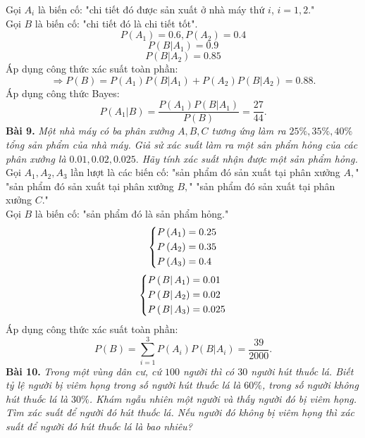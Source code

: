 \documentclass[12pt,a4paper]{article}
\begin{document}
Gọi $A_i$ là biến cố: "chi tiết đó được sản xuất ở nhà máy thứ $i$, $i = 1, 2$."\\
Gọi $B$ là biến cố: "chi tiết đó là chi tiết tốt".\\
$$P\left( {{A_1}} \right) = 0.6,P\left( {{A_2}} \right) = 0.4$$
$$P\left( {\left. B \right|{A_1}} \right) = 0.9$$
$$P\left( {\left. B \right|{A_2}} \right) = 0.85$$
Áp dụng công thức xác suất toàn phần:
$$ \Rightarrow P\left( B \right) = P\left( {{A_1}} \right)P\left( {\left. B \right|{A_1}} \right) + P\left( {{A_2}} \right)P\left( {\left. B \right|{A_2}} \right) = 0.88.$$
Áp dụng công thức Bayes:
$$P\left( {\left. {{A_1}} \right|B} \right) = \frac{{P\left( {{A_1}} \right)P\left( {\left. B \right|{A_1}} \right)}}{{P\left( B \right)}} = \frac{{27}}{{44}}.$$
\textbf{Bài 9.} \textit{Một nhà máy có ba phân xưởng $A, B, C$ tương ứng làm ra $25\%, 35\%, 40\%$ tổng sản phẩm của nhà máy. Giả sử xác suất làm ra một sản phẩm hỏng của các phân xưởng là $0.01, 0.02, 0.025.$ Hãy tính xác suất nhận được một sản phẩm hỏng.}\\
Gọi $A_1, A_2, A_3$ lần lượt là các biến cố: "sản phẩm đó sản xuất tại phân xưởng $A,$" "sản phẩm đó sản xuất tại phân xưởng $B,$" "sản phẩm đó sản xuất tại phân xưởng $C.$"\\
Gọi $B$ là biến cố: "sản phẩm đó là sản phẩm hỏng."\\
$$\left\{ \begin{gathered}
  P\left( {{A_1}} \right) = 0.25 \hfill \\
  P\left( {{A_2}} \right) = 0.35 \hfill \\
  P\left( {{A_3}} \right) = 0.4 \hfill \\ 
\end{gathered}  \right.$$
$$\left\{ \begin{gathered}
  P\left( {\left. B \right|{A_1}} \right) = 0.01 \hfill \\
  P\left( {\left. B \right|{A_2}} \right) = 0.02 \hfill \\
  P\left( {\left. B \right|{A_3}} \right) = 0.025 \hfill \\ 
\end{gathered}  \right.$$
Áp dụng công thức xác suất toàn phần:
$$P\left( B \right) = \sum\limits_{i = 1}^3 {P\left( {{A_i}} \right)P\left( {\left. B \right|{A_i}} \right)}  = \frac{{39}}{{2000}}.$$
\textbf{Bài 10.} \textit{Trong một vùng dân cư, cứ $100$ người thì có $30$ người hút thuốc lá. Biết tỷ lệ người bị viêm họng trong số người hút thuốc lá là $60\%$, trong số người không hút thuốc lá là $30\%$. Khám ngẫu nhiên một người và thấy người đó bị viêm họng. Tìm xác suất để người đó hút thuốc lá. Nếu người đó không bị viêm họng thì xác suất để người đó hút thuốc lá là bao nhiêu?}\\
\end{document}
